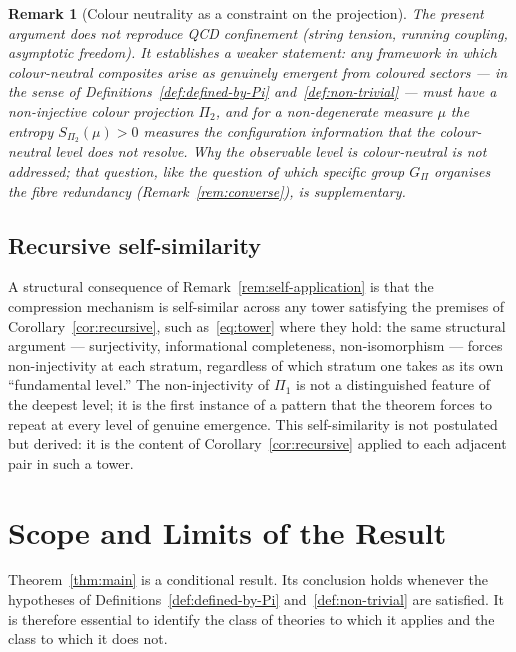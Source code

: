 \documentclass[12pt,a4paper]{article}
\newtheorem{remark}{Remark}
\begin{document}
    \begin{remark}[Colour neutrality as a constraint on the projection]
      \label{rem:confinement}
      The present argument does not reproduce QCD confinement (string tension, running coupling,
      asymptotic freedom).
      It establishes a weaker statement: any framework in which colour-neutral composites arise as
      genuinely emergent from coloured sectors --- in the sense of Definitions~\ref{def:defined-by-Pi}
      and~\ref{def:non-trivial} --- must have a non-injective colour projection $\Pi_2$, and for a
      non-degenerate measure $\mu$ the entropy $S_{\Pi_2}(\mu) > 0$ measures the configuration information
      that the colour-neutral level does not resolve.
      Why the observable level is colour-neutral is not addressed; that question, like the question of
      which specific group $G_\Pi$ organises the fibre redundancy (Remark~\ref{rem:converse}), is
      supplementary.
    \end{remark}

  \subsection*{Recursive self-similarity}

    A structural consequence of Remark~\ref{rem:self-application} is that the compression
    mechanism is self-similar across any tower satisfying the premises of
    Corollary~\ref{cor:recursive}, such as~\eqref{eq:tower} where they hold: the same structural
    argument --- surjectivity, informational completeness, non-isomorphism --- forces
    non-injectivity at each stratum, regardless of which stratum one takes as its own
    ``fundamental level.''
    The non-injectivity of $\Pi_1$ is not a distinguished feature of the deepest level; it
    is the first instance of a pattern that the theorem forces to repeat at every level of
    genuine emergence.
    This self-similarity is not postulated but derived: it is the content of
    Corollary~\ref{cor:recursive} applied to each adjacent pair in such a tower.

  \section{Scope and Limits of the Result}
  \label{sec:scope}

  Theorem~\ref{thm:main} is a conditional result.
  Its conclusion holds whenever the hypotheses of
  Definitions~\ref{def:defined-by-Pi} and~\ref{def:non-trivial} are satisfied.
  It is therefore essential to identify the class of theories to which it applies
  and the class to which it does not.
\end{document}
